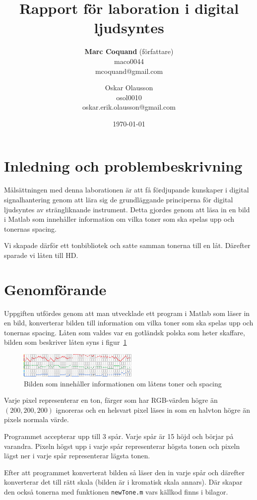 \documentclass[12pt]{article}
\title{Rapport för laboration i digital ljudsyntes}
\author{
    \textbf {Marc Coquand} (författare) \\
    maco0044 \\
    mcoquand@gmail.com\\
    \and
    Oskar Olausson \\
    osol0010 \\
    oskar.erik.olausson@gmail.com\\
}
\date{\today}
\begin{document}
\lstset{language=Matlab}
\maketitle
\tableofcontents

\newpage

\section{Inledning och problembeskrivning}

Målsättningen med denna laborationen är att få fördjupande kunskaper i digital
signalhantering genom att lära sig de grundläggande principerna för digital
ljudsyntes av strängliknande instrument. Detta gjordes genom att läsa in en bild
i Matlab som innehåller information om vilka toner som ska spelas upp och
tonernas spacing. 

Vi skapade därför ett tonbibliotek och satte samman tonerna till en låt.
Därefter sparade vi låten till HD.


\section{Genomförande}

Uppgiften utfördes genom att man utvecklade ett program i Matlab som läser in en
bild, konverterar bilden till information om vilka toner som ska spelas upp och
tonernas spacing. Låten som valdes var en gotländsk polska som heter skaffare,
bilden som beskriver låten syns i figur~\ref{fig:skaffare}

\begin{figure}[!htb]
    \centering
    \includegraphics[scale=1.5]{../SKAFFARE.png}
    \caption{Bilden som innehåller informationen om låtens toner och spacing}
    \label{fig:skaffare}
\end{figure}

Varje pixel representerar en ton, färger som har RGB-värden högre än
$(200,200,200)$ ignoreras och en helsvart pixel läses in som en halvton högre än
pixels normala värde. 

Programmet accepterar upp till 3 spår. Varje spår är 15 höjd och börjar på
varandra. Pixeln högst upp i varje spår representerar högsta tonen och pixeln
lägst ner i varje spår representerar lägsta tonen.

Efter att programmet konverterat bilden så läser den in varje spår och därefter
konverterar det till rätt skala (bilden är i kromatisk skala annars). Där skapar
den också tonerna med funktionen \texttt{newTone.m} vars källkod finns i bilagor.
\end{document}
